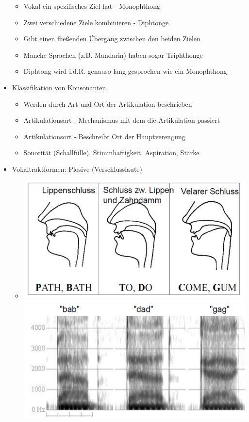 \documentclass[a4paper,10pt,oneside]{article}
\begin{document}
\begin{itemize}
\begin{itemize}
				\item Vokal ein spezifisches Ziel hat - Monophthong
				\item Zwei verschiedene Ziele kombinieren - Diphtonge
				\item Gibt einen fließenden Übergang zwischen den beiden Zielen
				\item Manche Sprachen (z.B. Mandarin) haben sogar Triphthonge 
				\item Diphtong wird i.d.R. genauso lang gesprochen wie ein Monophthong
			\end{itemize}
		\item Klassifikation von Konsonanten
			\begin{itemize}
				\item Werden durch Art und Ort der Artikulation beschrieben
				\item Artikulationsart - Mechanismus mit dem die Artikulation passiert
				\item Artikulationsort - Beschreibt Ort der Hauptverengung
				\item Sonorität (Schallfülle), Stimmhaftigkeit, Aspiration, Stärke
			\end{itemize}
		\item Vokaltraktformen: Plosive (Verschlusslaute)
			\begin{itemize}
				\item[] \includegraphics[scale=0.15]{Grafiken/1228.png} \includegraphics[scale=0.15]{Grafiken/1229.png}

\end{itemize}
\end{itemize}
\end{document}
